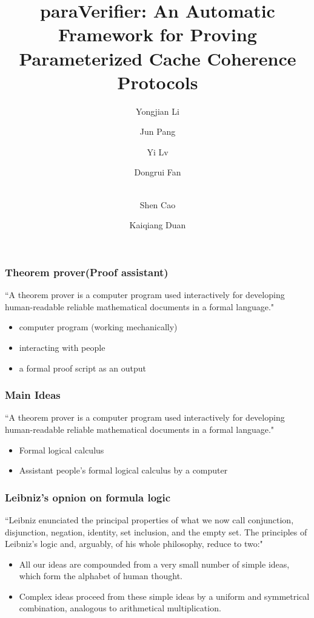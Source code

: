 \documentclass{beamer}
\begin{document}
\title{ {\sf paraVerifier}: An Automatic Framework for Proving Parameterized Cache Coherence Protocols}

\author{Yongjian Li \and Jun Pang \and Yi Lv
\and Dongrui Fan \and \\ Shen Cao \and Kaiqiang Duan}


\frame{\titlepage}




\begin{frame}\frametitle{Theorem prover(Proof assistant)}
\noindent
``A theorem prover is a computer program used interactively for developing human-readable reliable mathematical documents in a formal language."
\begin{itemize}
\item computer program (working mechanically)
\item interacting with people
\item a formal proof script as an output
\end{itemize}
\end{frame}

\begin{frame}\frametitle{Main Ideas}
\noindent
``A theorem prover is a computer program used interactively for developing human-readable reliable mathematical documents in a formal language."
\begin{itemize}
\item Formal logical calculus
\item Assistant people's formal logical calculus by a computer
\end{itemize}
\end{frame}


\begin{frame}\frametitle{Leibniz's opnion on formula logic }
``Leibniz enunciated the principal properties of what we now call conjunction, disjunction, negation, identity, set inclusion, and the empty set.
The principles of Leibniz's logic and, arguably, of his whole philosophy, reduce to two:"
\begin{itemize}
\item  All our ideas are compounded from a very small number of simple ideas, which form the alphabet of human thought.
\item Complex ideas proceed from these simple ideas by a uniform and symmetrical combination, analogous to arithmetical multiplication.
\end{itemize}
\end{frame}
\end{document}
